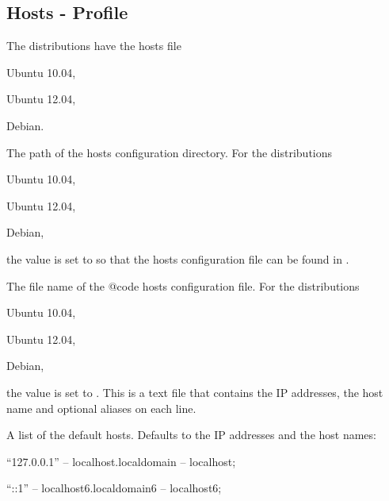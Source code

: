 \subsection{Hosts - Profile}

The distributions have the hosts file
\begin{compactitem}
\item[\TheDistribution{ubuntu}] Ubuntu 10.04,
\item[\TheDistribution{ubuntu}] Ubuntu 12.04,
\item[\TheDistribution{debian}] Debian.
\end{compactitem}


The path of the hosts configuration directory.
For the distributions 
\begin{inparaitem}
\item[\TheDistribution{ubuntu}] Ubuntu 10.04,
\item[\TheDistribution{ubuntu}] Ubuntu 12.04,
\item[\TheDistribution{debian}] Debian,
\end{inparaitem}
the value is set to  so that the hosts configuration 
file can be found in .


The file name of the {@code hosts} configuration file.
For the distributions 
\begin{inparaitem}
\item[\TheDistribution{ubuntu}] Ubuntu 10.04,
\item[\TheDistribution{ubuntu}] Ubuntu 12.04,
\item[\TheDistribution{debian}] Debian,
\end{inparaitem}
the value is set to . This is a text file that contains 
the IP addresses, the host name and optional aliases on each line.


A list of the default hosts.
Defaults to the IP addresses and the host names:
\begin{compactitem}
\item ``127.0.0.1'' -- localhost.localdomain -- localhost;
\item ``::1'' -- localhost6.localdomain6 -- localhost6;
\end{compactitem}

